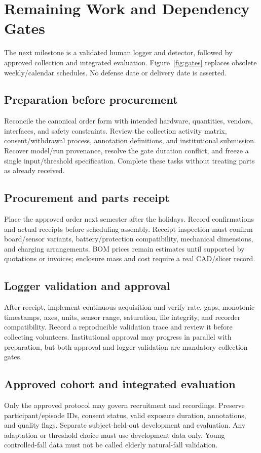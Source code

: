 \chapter{Remaining Work and Dependency Gates}
\label{ch:remaining}
The next milestone is a validated human logger and detector, followed by approved collection and integrated evaluation. Figure~\ref{fig:gates} replaces obsolete weekly/calendar schedules. No defense date or delivery date is asserted.


\section{Preparation before procurement}
Reconcile the canonical order form with intended hardware, quantities, vendors, interfaces, and safety constraints. Review the collection activity matrix, consent/withdrawal process, annotation definitions, and institutional submission. Recover model/run provenance, resolve the gate duration conflict, and freeze a single input/threshold specification. Complete these tasks without treating parts as already received.

\section{Procurement and parts receipt}
Place the approved order next semester after the holidays. Record confirmations and actual receipts before scheduling assembly. Receipt inspection must confirm board/sensor variants, battery/protection compatibility, mechanical dimensions, and charging arrangements. BOM prices remain estimates until supported by quotations or invoices; enclosure mass and cost require a real CAD/slicer record.

\section{Logger validation and approval}
After receipt, implement continuous acquisition and verify rate, gaps, monotonic timestamps, axes, units, sensor range, saturation, file integrity, and recorder compatibility. Record a reproducible validation trace and review it before collecting volunteers. Institutional approval may progress in parallel with preparation, but both approval and logger validation are mandatory collection gates.

\section{Approved cohort and integrated evaluation}
Only the approved protocol may govern recruitment and recordings. Preserve participant/episode IDs, consent status, valid exposure duration, annotations, and quality flags. Separate subject-held-out development and evaluation. Any adaptation or threshold choice must use development data only. Young controlled-fall data must not be called elderly natural-fall validation.

